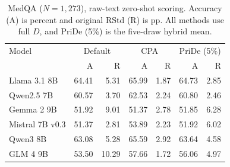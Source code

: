 \begin{table}[htbp]
\centering\small\setlength{\tabcolsep}{4pt}
\caption{MedQA ($N=1,273$), raw-text zero-shot scoring. Accuracy (A) is percent and original RStd (R) is pp. All methods use full $D$, and PriDe (5\%) is the five-draw hybrid mean.}
\label{tab:results-pride-medqa}
\begin{tabular}{lrrrrrr}
\toprule
Model & \multicolumn{2}{c}{Default} & \multicolumn{2}{c}{CPA} & \multicolumn{2}{c}{PriDe (5\%)}\\
 & A & R & A & R & A & R\\
\midrule
Llama 3.1 8B & 64.41 & 5.31 & 65.99 & 1.87 & 64.73 & 2.85\\
Qwen2.5 7B & 60.57 & 3.70 & 62.53 & 2.24 & 60.80 & 2.46\\
Gemma 2 9B & 51.92 & 9.01 & 51.37 & 2.78 & 51.85 & 6.28\\
Mistral 7B v0.3 & 51.37 & 2.81 & 53.89 & 2.23 & 51.92 & 6.02\\
Qwen3 8B & 63.08 & 5.28 & 65.59 & 2.92 & 63.64 & 4.58\\
GLM 4 9B & 53.50 & 10.29 & 57.66 & 1.72 & 56.06 & 4.97\\
\bottomrule
\end{tabular}
\end{table}
